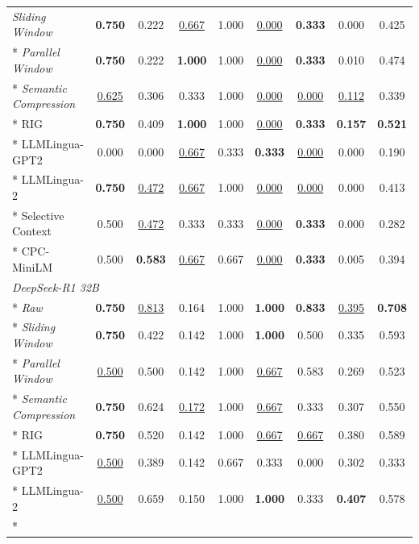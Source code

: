 {\begin{longtable}{lcc|cc|cc|c|c}
\textit{Sliding Window}        & \textbf{0.750} & 0.222 & \underline{0.667} & 1.000 & \underline{0.000} & \textbf{0.333} & 0.000 & 0.425 \\*
\textit{Parallel Window}       & \textbf{0.750} & 0.222 & \textbf{1.000} & 1.000 & \underline{0.000} & \textbf{0.333} & 0.010 & 0.474 \\*
\textit{Semantic Compression}  & \underline{0.625} & 0.306 & 0.333 & 1.000 & \underline{0.000} & \underline{0.000} & \underline{0.112} & 0.339 \\*
RIG                            & \textbf{0.750} & 0.409 & \textbf{1.000} & 1.000 & \underline{0.000} & \textbf{0.333} & \textbf{0.157} & \textbf{0.521} \\*
LLMLingua-GPT2                 & 0.000 & 0.000 & \underline{0.667} & 0.333 & \textbf{0.333} & \underline{0.000} & 0.000 & 0.190 \\*
LLMLingua-2                    & \textbf{0.750} & \underline{0.472} & \underline{0.667} & 1.000 & \underline{0.000} & \underline{0.000} & 0.000 & 0.413 \\*
Selective Context              & 0.500 & \underline{0.472} & 0.333 & 0.333 & \underline{0.000} & \textbf{0.333} & 0.000 & 0.282 \\*
CPC-MiniLM                     & 0.500 & \textbf{0.583} & \underline{0.667} & 0.667 & \underline{0.000} & \textbf{0.333} & 0.005 & 0.394 \\
\midrule
\multicolumn{9}{l}{\textit{DeepSeek-R1 32B}} \\*
\textit{Raw}                   & \textbf{0.750} & \underline{0.813} & 0.164 & 1.000 & \textbf{1.000} & \textbf{0.833} & \underline{0.395} & \textbf{0.708} \\*
\textit{Sliding Window}        & \textbf{0.750} & 0.422 & 0.142 & 1.000 & \textbf{1.000} & 0.500 & 0.335 & 0.593 \\*
\textit{Parallel Window}       & \underline{0.500} & 0.500 & 0.142 & 1.000 & \underline{0.667} & 0.583 & 0.269 & 0.523 \\*
\textit{Semantic Compression}  & \textbf{0.750} & 0.624 & \underline{0.172} & 1.000 & \underline{0.667} & 0.333 & 0.307 & 0.550 \\*
RIG                            & \textbf{0.750} & 0.520 & 0.142 & 1.000 & \underline{0.667} & \underline{0.667} & 0.380 & 0.589 \\*
LLMLingua-GPT2                 & \underline{0.500} & 0.389 & 0.142 & 0.667 & 0.333 & 0.000 & 0.302 & 0.333 \\*
LLMLingua-2                    & \underline{0.500} & 0.659 & 0.150 & 1.000 & \textbf{1.000} & 0.333 & \textbf{0.407} & 0.578 \\*

\end{longtable}}
